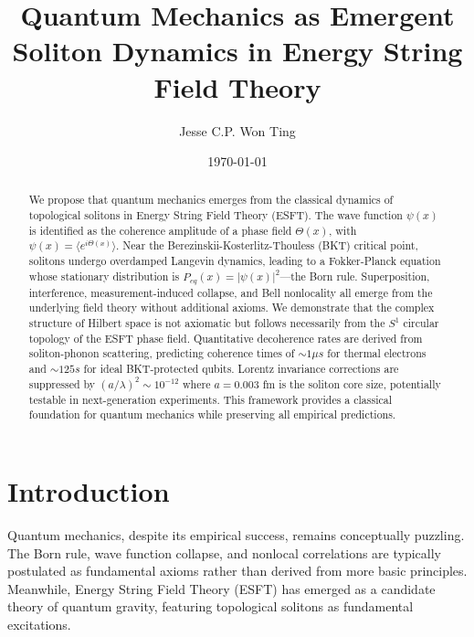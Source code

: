 ﻿\documentclass[twocolumn,showpacs,preprintnumbers,amsmath,amssymb,prd]{revtex4-2}
\begin{document}

\title{Quantum Mechanics as Emergent Soliton Dynamics in Energy String Field Theory}

\author{Jesse C.P. Won Ting}

\date{\today}

\begin{abstract}
We propose that quantum mechanics emerges from the classical dynamics of topological solitons in Energy String Field Theory (ESFT). The wave function $\psi(x)$ is identified as the coherence amplitude of a phase field $\Theta(x)$, with $\psi(x) = \langle e^{i\Theta(x)}\rangle$. Near the Berezinskii-Kosterlitz-Thouless (BKT) critical point, solitons undergo overdamped Langevin dynamics, leading to a Fokker-Planck equation whose stationary distribution is $P_{eq}(x) = |\psi(x)|^2$---the Born rule. Superposition, interference, measurement-induced collapse, and Bell nonlocality all emerge from the underlying field theory without additional axioms. We demonstrate that the complex structure of Hilbert space is not axiomatic but follows necessarily from the $S^1$ circular topology of the ESFT phase field. Quantitative decoherence rates are derived from soliton-phonon scattering, predicting coherence times of $\sim 1 \mu s$ for thermal electrons and $\sim 125 s$ for ideal BKT-protected qubits. Lorentz invariance corrections are suppressed by $(a/\lambda)^2 \sim 10^{-12}$ where $a = 0.003$ fm is the soliton core size, potentially testable in next-generation experiments. This framework provides a classical foundation for quantum mechanics while preserving all empirical predictions.
\end{abstract}

\maketitle

\section{Introduction}

Quantum mechanics, despite its empirical success, remains conceptually puzzling. The Born rule, wave function collapse, and nonlocal correlations are typically postulated as fundamental axioms rather than derived from more basic principles. Meanwhile, Energy String Field Theory (ESFT) has emerged as a candidate theory of quantum gravity, featuring topological solitons as fundamental excitations.
\end{document}
